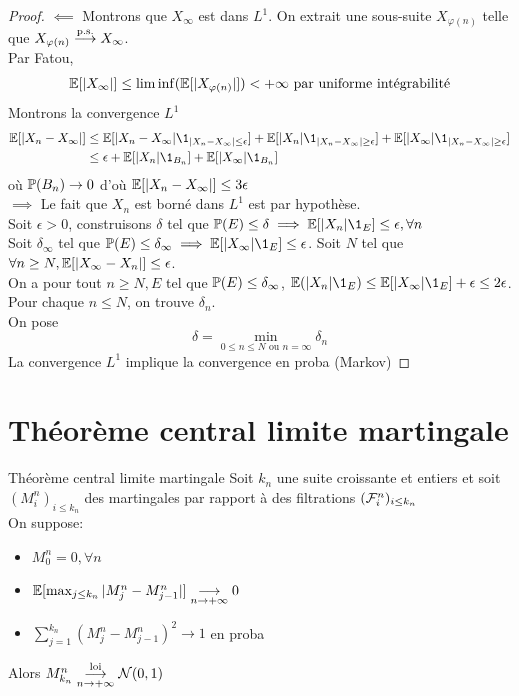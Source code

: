 \documentclass[]{report}
\begin{document}
    \begin{proof}
        $\impliedby$ Montrons que $X_\infty$ est dans $L^1$. On extrait une sous-suite $X_{\varphi(n)}$ telle que $X_{\varphi(n)}\overset{\text{p.s.}}{\longrightarrow} X_\infty$.\\
        Par Fatou,
        \begin{align*}
            \mathbb{E}[|X_\infty|]\le \liminf(\mathbb{E}[|X_{\varphi(n)}|])<+\infty\text{ par uniforme intégrabilité}
        \end{align*}
        Montrons la convergence $L^1$
        \begin{align*}
            \Ea[|X_n-X_\infty|]&\le \Ea[|X_n-X_\infty|\1_{|X_n-X_\infty|\le \epsilon}]+\Ea[|X_n|\1_{|X_n-X_\infty|\ge \epsilon}]+\Ea[|X_\infty|\1_{|X_n-X_\infty|\ge \epsilon}]\\
            &\le \epsilon +\Ea[|X_n|\1_{B_n}]+\Ea[|X_\infty|\1_{B_n}]
        \end{align*}
        où $\mathbb{P}(B_n)\to 0$ d'où $\mathbb{E}[|X_n-X_\infty|]\le 3\epsilon$\\
        $\implies$ Le fait que $X_n$ est borné dans $L^1$ est par hypothèse.\\
            Soit $\epsilon>0$, construisons $\delta$ tel que $\Pa(E)\le \delta \implies \Ea[|X_n|\1_E]\le \epsilon,\forall n$\\
            Soit $\delta_\infty$ tel que $\Pa(E)\le \delta_\infty\implies \Ea[|X_\infty|\1_E]\le \epsilon$. Soit $N$ tel que $\forall n\ge N,\mathbb{E}[|X_\infty-X_n|]\le \epsilon$.\\
            On a pour tout $n\ge N,E$ tel que $\mathbb{P}(E)\le \delta_\infty$, $\Ea(|X_n|\1_E)\le \Ea[|X_\infty|\1_E]+\epsilon\le 2\epsilon$. Pour chaque $n\le N$, on trouve $\delta_n$.\\
            On pose
            \[\delta=\min_{0\le n\le N\text{ ou }n=\infty} \delta_n\] 
            La convergence $L^1$ implique la convergence en proba (Markov)
    \end{proof}

    \section{Théorème central limite martingale}

    \begin{tm}{Théorème central limite martingale}{}
        Soit $k_n$ une suite croissante et entiers et soit $(M_i^n)_{i\le k_n}$ des martingales par rapport à des filtrations $(\mathcal{F}_i^n)_{i\le k_n}$\\
        On suppose:
        \begin{itemize}
            \item $M_0^n=0,\forall n$
            \item $\mathbb{E}[\max_{j\le k_n}|M^n_j -M^n_{j-1}|]\underset{n\to +\infty}{\longrightarrow} 0$
            \item $\sum_{j=1}^{k_n}(M^n_j-M^n_{j-1})^2\to 1$ en proba
        \end{itemize}
        Alors $M_{k_n}^n\overset{\text{loi}}{\underset{n\to +\infty}{\longrightarrow}}\mathcal{N}(0,1)$
    \end{tm}
\end{document}

